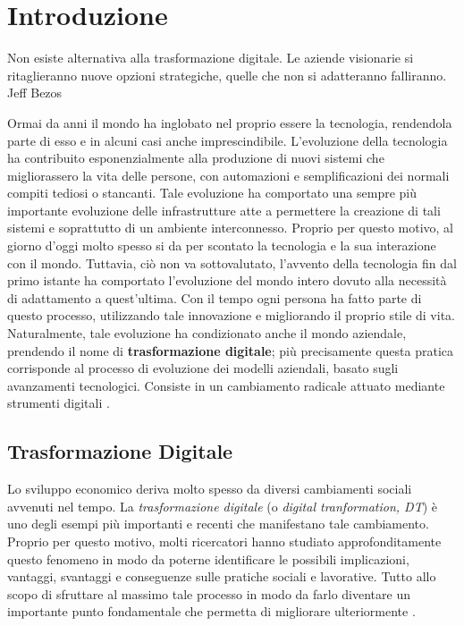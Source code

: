 \chapter{Introduzione}
\label{ch:Introduzione}

\begin{citazione}
Non esiste alternativa alla trasformazione digitale. Le aziende visionarie si ritaglieranno nuove opzioni strategiche, quelle che non si adatteranno falliranno. Jeff Bezos \cite{jeff_bezos_cite}
\end{citazione}

Ormai da anni il mondo ha inglobato nel proprio essere la tecnologia, rendendola parte di esso e in alcuni casi anche imprescindibile. L’evoluzione della tecnologia ha contribuito esponenzialmente alla produzione di nuovi sistemi che migliorassero la vita delle persone, con automazioni e semplificazioni dei normali compiti tediosi o stancanti. Tale evoluzione ha comportato una sempre più importante evoluzione delle infrastrutture atte a permettere la creazione di tali sistemi e soprattutto di un ambiente interconnesso. Proprio per questo motivo, al giorno d'oggi molto spesso si da per scontato la tecnologia e la sua interazione con il mondo. Tuttavia, ciò non va sottovalutato, l'avvento della tecnologia fin dal primo istante ha comportato l'evoluzione del mondo intero dovuto alla necessità di adattamento a quest'ultima. Con il tempo ogni persona ha fatto parte di questo processo, utilizzando tale innovazione e migliorando il proprio stile di vita. Naturalmente, tale evoluzione ha condizionato anche il mondo aziendale, prendendo il nome di \textbf{trasformazione digitale}; più precisamente questa pratica corrisponde al processo di evoluzione dei modelli aziendali, basato sugli avanzamenti tecnologici. Consiste in un cambiamento radicale attuato mediante strumenti digitali \cite{redhat_digital_transformation}.

\section{Trasformazione Digitale}
Lo sviluppo economico deriva molto spesso da diversi cambiamenti sociali avvenuti nel tempo. La \textit{trasformazione digitale} (o \textit{digital tranformation, DT}) è uno degli esempi più importanti e recenti che manifestano tale cambiamento. Proprio per questo motivo, molti ricercatori hanno studiato approfonditamente questo fenomeno in modo da poterne identificare le possibili implicazioni, vantaggi, svantaggi e conseguenze sulle pratiche sociali e lavorative. Tutto allo scopo di sfruttare al massimo tale processo in modo da farlo diventare un importante punto fondamentale che permetta di migliorare ulteriormente \cite{sciencedirect_digital_transformation}.

